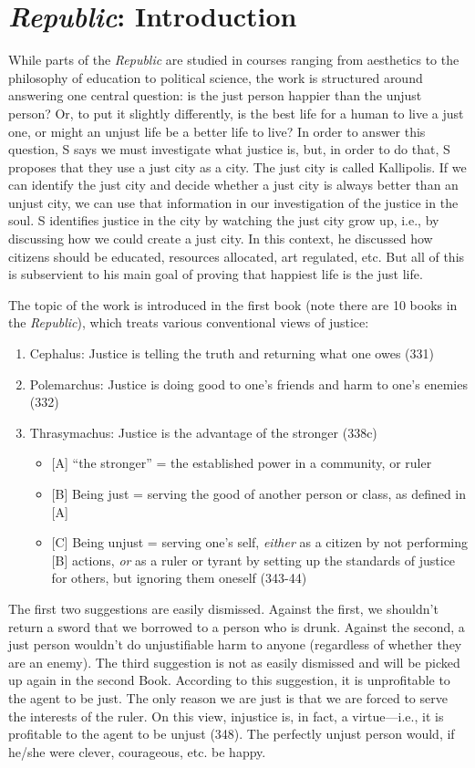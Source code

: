 \documentclass[oneside]{article}
\begin{document}
\section*{\emph{Republic}: Introduction}

While parts of the \emph{Republic} are studied in courses ranging from aesthetics to the philosophy of education to political science, the work is structured around answering one central question: is the just person happier than the unjust person? Or, to put it slightly differently, is the best life for a human to live a just one, or might an unjust life be a better life to live? In order to answer this question, S says we must investigate what justice is, but, in order to do that, S proposes that they use a just city as a city. The just city is called Kallipolis. If we can identify the just city and decide whether a just city is always better than an unjust city, we can use that information in our investigation of the justice in the soul. S identifies justice in the city by watching the just city grow up, i.e., by discussing how we could create a just city. In this context, he discussed how citizens should be educated, resources allocated, art regulated, etc. But all of this is subservient to his main goal of proving that happiest life is the just life. 

The topic of the work is introduced in the first book (note there are 10 books in the \emph{Republic}), which treats various conventional views of justice:
\begin{enumerate}
\item Cephalus: Justice is telling the truth and returning what one owes (331)
\item Polemarchus: Justice is doing good to one's friends and harm to one's enemies (332)
\item Thrasymachus: Justice is the advantage of the stronger (338c)
\begin{itemize}
\item{[A] ``the stronger'' = the established power in a community, or ruler}
\item{[B] Being just = serving the good of another person or class, as defined in [A]}
\item{[C] Being unjust = serving one's self, \emph{either} as a citizen by not performing [B] actions, \emph{or} as a ruler or tyrant by setting up the standards of justice for others, but ignoring them oneself (343-44)}
\end{itemize}
\end{enumerate}
The first two suggestions are easily dismissed. Against the first, we shouldn't return a sword that we borrowed to a person who is drunk. Against the second, a just person wouldn't do unjustifiable harm to anyone (regardless of whether they are an enemy). The third suggestion is not as easily dismissed and will be picked up again in the second Book. According to this suggestion, it is unprofitable to the agent to be just. The only reason we are just is that we are forced to serve the interests of the ruler. On this view, injustice is, in fact, a virtue---i.e., it is profitable to the agent to be unjust (348). The perfectly unjust person would, if he/she were clever, courageous, etc. be happy. 
\end{document}
